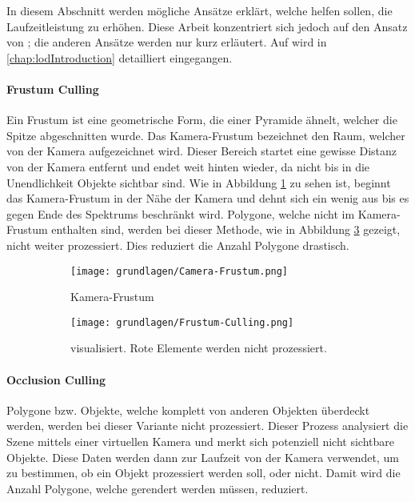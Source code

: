 In diesem Abschnitt werden mögliche Ansätze erklärt, welche helfen sollen, die Laufzeitleistung zu erhöhen. Diese Arbeit konzentriert sich jedoch auf den Ansatz von ; die anderen Ansätze werden nur kurz erläutert. Auf  wird in \autoref{chap:lodIntroduction} detailliert eingegangen.

\paragraph{Frustum Culling}
Ein Frustum ist eine geometrische Form, die einer Pyramide ähnelt, welcher die Spitze abgeschnitten wurde.
Das Kamera-Frustum bezeichnet den Raum, welcher von der Kamera aufgezeichnet wird. Dieser Bereich startet eine gewisse Distanz von der Kamera entfernt und endet weit hinten wieder, da nicht bis in die Unendlichkeit Objekte sichtbar sind.
Wie in Abbildung \ref{fig:CameraFrustum} zu sehen ist, beginnt das Kamera-Frustum in der Nähe der Kamera und dehnt sich ein wenig aus bis es gegen Ende des Spektrums beschränkt wird.
Polygone, welche nicht im Kamera-Frustum enthalten sind, werden bei dieser Methode, wie in Abbildung \ref{fig:FrustumCulling} gezeigt, nicht weiter prozessiert.
Dies reduziert die Anzahl Polygone drastisch.

\begin{figure}[H]
  \centering
  \begin{subfigure}{.5\textwidth}
    \centering
    \texttt{[image: grundlagen/Camera-Frustum.png]}
    \caption{Kamera-Frustum}
    \label{fig:CameraFrustum}
  \end{subfigure}%
  \begin{subfigure}{.5\textwidth}
    \centering
    \texttt{[image: grundlagen/Frustum-Culling.png]}
    \caption{ visualisiert. Rote Elemente werden nicht prozessiert.}
    \label{fig:FrustumCulling}
  \end{subfigure}
  \caption{}
\end{figure}

\pagebreak

\paragraph{Occlusion Culling}
Polygone bzw. Objekte, welche komplett von anderen Objekten überdeckt werden, werden bei dieser Variante nicht prozessiert.
Dieser Prozess analysiert die Szene mittels einer virtuellen Kamera und merkt sich potenziell nicht sichtbare Objekte. Diese Daten werden dann zur Laufzeit von der Kamera verwendet, um zu bestimmen, ob ein Objekt prozessiert werden soll, oder nicht.
Damit wird die Anzahl Polygone, welche gerendert werden müssen, reduziert.

